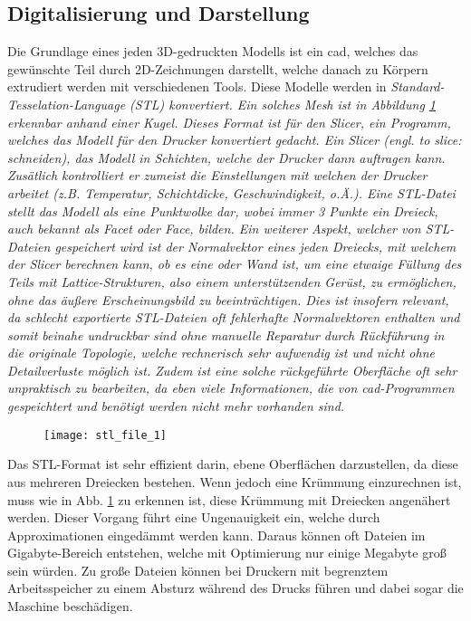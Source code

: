 \documentclass[../main.tex]{subfiles}
\begin{document}
\subsection{Digitalisierung und Darstellung}
Die Grundlage eines jeden 3D-gedruckten Modells ist ein \acrfull{cad}, welches das gewünschte Teil durch 2D-Zeichnungen darstellt, welche danach zu Körpern extrudiert werden mit verschiedenen Tools. Diese Modelle werden  in \it{Standard-Tesselation-Language} (STL) konvertiert. Ein solches \it{Mesh} ist in Abbildung \ref{img:stl_1} erkennbar anhand einer Kugel. Dieses Format ist für den \it{Slicer}, ein Programm, welches das Modell für den Drucker konvertiert gedacht. Ein Slicer (engl. \it{to slice}: schneiden),  das Modell in Schichten, welche der Drucker dann auftragen kann. Zusätlich kontrolliert er zumeist die Einstellungen mit welchen der Drucker arbeitet (z.B. Temperatur, Schichtdicke, Geschwindigkeit, o.Ä.). Eine STL-Datei stellt das Modell als eine Punktwolke dar, wobei immer 3 Punkte ein Dreieck, auch bekannt als \it{Facet} oder \it{Face}, bilden. Ein weiterer Aspekt, welcher von STL-Dateien gespeichert wird ist der Normalvektor eines jeden Dreiecks, mit welchem der Slicer berechnen kann, ob es eine  oder  Wand ist, um eine etwaige Füllung des Teils mit \it{Lattice}-Strukturen, also einem unterstützenden Gerüst, zu ermöglichen, ohne das äußere Erscheinungsbild zu beeinträchtigen. Dies ist insofern relevant, da schlecht exportierte STL-Dateien oft fehlerhafte Normalvektoren enthalten und somit beinahe undruckbar sind ohne manuelle Reparatur durch Rückführung in die originale Topologie, welche rechnerisch sehr aufwendig ist und nicht ohne Detailverluste möglich ist. Zudem ist eine solche rückgeführte Oberfläche oft sehr unpraktisch zu bearbeiten, da eben viele Informationen, die von \acrshort{cad}-Programmen gespeichtert und benötigt werden nicht mehr vorhanden sind.
\begin{figure}[h]
\begin{center}
	\texttt{[image: stl\_file\_1]}
	\label{img:stl_1}
\end{center}
\end{figure}	
Das STL-Format ist sehr effizient darin, ebene Oberflächen darzustellen, da diese aus mehreren Dreiecken bestehen. Wenn jedoch eine Krümmung einzurechnen ist, muss wie in Abb. \ref{img:stl_1} zu erkennen ist, diese Krümmung mit Dreiecken angenähert werden. Dieser Vorgang führt eine Ungenauigkeit ein, welche durch Approximationen eingedämmt werden kann. Daraus können oft Dateien im Gigabyte-Bereich entstehen, welche mit Optimierung nur einige Megabyte groß sein würden. Zu große Dateien können bei Druckern mit begrenztem Arbeitsspeicher zu einem Absturz während des Drucks führen und dabei sogar die Maschine beschädigen. \parencite{stl_1} 
\end{document}
